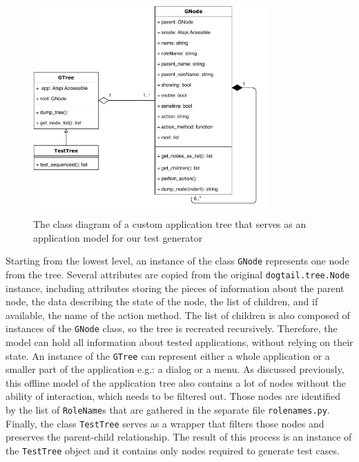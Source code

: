 \begin{figure}[hbt!]
	\centering
	\includegraphics[width=0.8\textwidth,clip]{obrazky-figures/tree_diagram.pdf}
	\caption{The class diagram of a custom application tree that serves as an application model for our test generator}
	\label{tree_diagram}
\end{figure}

Starting from the lowest level, an instance of the class \texttt{GNode} represents one node from the tree. Several attributes are copied from the original \texttt{dogtail.tree.Node} instance, including attributes storing the pieces of information about the parent node, the data describing the state of the node, the list of children, and if available, the name of the action method. The list of children is also composed of instances of the \texttt{GNode} class, so the tree is recreated recursively. Therefore, the model can hold all information about tested applications, without relying on their state. An instance of the \texttt{GTree} can represent either a whole application or a smaller part of the application e.g.: a dialog or a menu. As discussed previously, this offline model of the application tree also contains a lot of nodes without the ability of interaction, which needs to be filtered out. Those nodes are identified by the list of \texttt{RoleName}s that are gathered in the separate file \texttt{rolenames.py}. Finally, the class \texttt{TestTree} serves as a wrapper that filters those nodes and preserves the parent-child relationship. The result of this process is an instance of the \texttt{TestTree} object and it contains only nodes required to generate test cases. 

